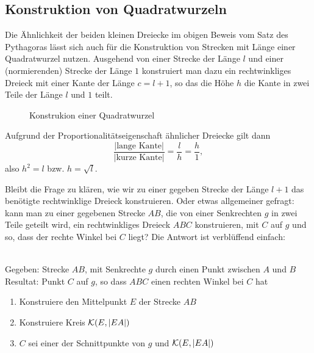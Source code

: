 \subsection*{Konstruktion von Quadratwurzeln}

Die Ähnlichkeit der beiden kleinen Dreiecke im obigen Beweis vom Satz des Pythagoras lässt sich auch
für die Konstruktion von Strecken mit Länge einer Quadratwurzel nutzen.  Ausgehend von einer Strecke
der Länge $l$ und einer (normierenden) Strecke der Länge $1$ konstruiert man dazu ein rechtwinkliges
Dreieck mit einer Kante der Länge $c=l+1$, so das die Höhe $h$ die Kante in zwei Teile der Länge $l$
und $1$ teilt.

\begin{figure}[h]
    
    \caption{Konstrukion einer Quadratwurzel}
\end{figure}

Aufgrund der Proportionalitätseigenschaft ähnlicher Dreiecke gilt dann
$$
    \frac{|\mbox{lange Kante}|}{|\mbox{kurze Kante}|}=\frac{l}{h}=\frac{h}{1},
$$
also $h^2=l$ bzw. $h=\sqrt{l}$.


Bleibt die Frage zu klären, wie wir zu einer gegeben Strecke der Länge $l+1$ das benötigte
rechtwinklige Dreieck konstruieren. Oder etwas allgemeiner gefragt: kann man zu einer gegebenen
Strecke $AB$, die von einer Senkrechten $g$ in zwei Teile geteilt wird, ein rechtwinkliges Dreieck
$ABC$ konstruieren, mit $C$ auf $g$ und so, dass der rechte Winkel bei $C$ liegt? Die Antwort ist
verblüffend einfach:

\begin{konst}\ \\
    Gegeben: Strecke $AB$, mit Senkrechte $g$ %
        durch einen Punkt zwischen $A$ und $B$\\
    Resultat: Punkt $C$ auf $g$, so dass $ABC$ einen rechten Winkel bei $C$ hat
    \renewcommand{\labelenumi}{\arabic{enumi}.} %
    \begin{enumerate}
        \item Konstruiere den Mittelpunkt $E$ der Strecke $AB$
        \item Konstruiere Kreis ${\mathcal K}(E,|EA|)$
        \item $C$ sei einer der Schnittpunkte von $g$ und ${\mathcal K}(E,|EA|)$
    \end{enumerate}
\end{konst}

